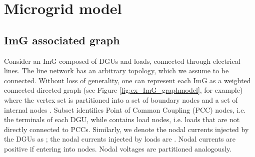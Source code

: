 \documentclass[a4paper]{article}
\theoremstyle{plain}
\begin{document}
     \section{Microgrid model}
     \label{sec:ImGmodel}
\subsection{ImG associated graph}
\label{sec:ImGgraph}
Consider an ImG composed of DGUs and loads, connected through electrical lines. The line network has an arbitrary topology, which we assume to be connected. Without loss of generality, one can represent each ImG as a weighted connected directed graph  (see Figure \ref{fig:ex_ImG_graphmodel}, for example) where the vertex set  is partitioned into a set of boundary nodes  and a set of internal nodes . Subset  identifies Point of Common Coupling (PCC) nodes, i.e. the terminals of each DGU, while  contains load nodes, i.e. loads that are not directly connected to PCCs. Similarly, we denote the nodal currents injected by the DGUs as ; the nodal currents injected by loads are . Nodal currents are positive if entering into nodes. Nodal voltages are partitioned analogously. 
\end{document}
